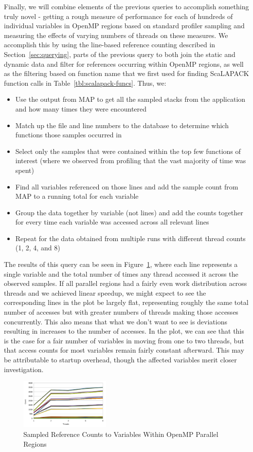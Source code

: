 Finally, we will combine elements of the previous queries to accomplish something truly novel - getting a rough measure of performance for each of hundreds of individual variables in OpenMP regions based on standard profiler sampling and measuring the effects of varying numbers of threads on these measures.
We accomplish this by using the line-based reference counting described in Section~\ref{sec:querying}, parts of the previous query to both join the static and dynamic data and filter for references occurring within OpenMP regions, as well as the filtering based on function name that we first used for finding ScaLAPACK function calls in Table~\ref{tbl:scalapack-funcs}.
Thus, we:
\begin{itemize}
\item Use the output from MAP to get all the sampled stacks from the application and how many times they were encountered
\item Match up the file and line numbers to the database to determine which functions those samples occurred in
\item Select only the samples that were contained within the top few functions of interest (where we observed from profiling that the vast majority of time was spent)
\item Find all variables referenced on those lines and add the sample count from MAP to a running total for each variable
\item Group the data together by variable (not lines) and add the counts together for every time each variable was accessed across all relevant lines
\item Repeat for the data obtained from multiple runs with different thread counts (1, 2, 4, and 8)
\end{itemize}
The results of this query can be seen in Figure~\ref{fig:openmp-refcount}, where each line represents a single variable and the total number of times any thread accessed it across the observed samples.
If all parallel regions had a fairly even work distribution across threads and we achieved linear speedup, we might expect to see the corresponding lines in the plot be largely flat, representing roughly the same total number of accesses but with greater numbers of threads making those accesses concurrently.
This also means that what we don't want to see is deviations resulting in increases to the number of accesses.
In the plot, we can see that this is the case for a fair number of variables in moving from one to two threads, but that access counts for most variables remain fairly constant afterward.
This may be attributable to startup overhead, though the affected variables merit closer investigation.

\begin{figure}
\begin{center}
\includegraphics[width=0.4\textwidth]{images/cp2k-omp-inc-full.pdf}
\end{center}
\caption{Sampled Reference Counts to Variables Within OpenMP Parallel Regions}
\label{fig:openmp-refcount}
\end{figure}
